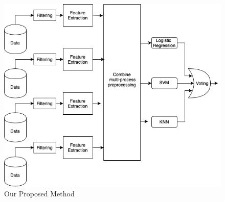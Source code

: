 \begin{figure}[b]
    \centering
    \includegraphics[width=\columnwidth]{tex/figures/model.png}
    \caption{Our Proposed Method}
    \label{fig:model}
\end{figure}
